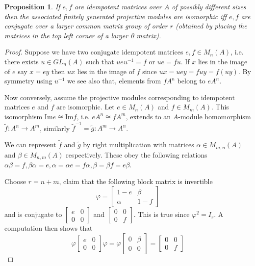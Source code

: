 \documentclass[12pt]{report}
\numberwithin{equation}{section}
\newcommand{\image}{{\mathrm{Im}}}
\newcounter{dummy} \numberwithin{dummy}{section}
\newtheorem{proposition}[dummy]{Proposition}
\begin{document}
	\begin{proposition}
		If $e, f $ are idempotent matrices over $A$ of possibly different sizes then the associated finitely generated projective modules are isomorphic iff $e,f $ are conjugate over a larger common matrix group of order $r$ (obtained by placing the matrices in the top left corner of a larger 0 matrix).
	\end{proposition}
	\begin{proof}
		Suppose we have two conjugate idempotent matrices $e,f \in M_n(A)$, i.e. there exists $u \in GL_n(A)$ such that $ueu^{-1}=f$ or $ue=fu.$ If $x $ lies in the image of $e$ say $x=ey$ then $ux$ lies in the image of $f $ since $ux=uey=fuy=f(uy)	$. By symmetry using $u^{-1}$ we see also that, elements from $fA^n$ belong to $eA^n$.
		
		Now conversely, assume the projective modules corresponding to idempotent matrices $e$ and $f$ are isomorphic.  Let $e \in M_n(A)$ and $f \in M_m(A)$.  This isomorphism $\image e \cong \image f$, i.e. $e A^n \cong  fA^m$, extends to an $A$-module homomorphism $\tilde{f} \colon A^n \to A^m$, similarly $\tilde{f}^{-1} = \tilde{g} \colon A^m \to A^n$. 
		
		We can represent $\tilde{f}$ and $\tilde{g}$ by right multiplication with matrices $\alpha \in M_{m,n}(A)$ and $\beta \in M_{n,m}(A)$ respectively. These obey the following relations $\alpha \beta = f, \beta \alpha=e, \alpha=\alpha e=f \alpha, \beta= \beta f= e \beta  $.
		
		Choose $r = n + m$, claim that the following block matrix is invertible 
		\[
		\varphi = \begin{bmatrix}
			1-e & \beta   \\
			\alpha & 1-f
		\end{bmatrix}
		\]
		and is conjugate to $\begin{bmatrix} e & 0 \\ 0 & 0 \end{bmatrix}$ and $\begin{bmatrix} 0 & 0 \\ 0 & f \end{bmatrix}$.  
		This is true since $\varphi^2=I_{r}$. A computation then shows that \[ \varphi \begin{bmatrix}
			e & 0 \\
			0 & 0
		\end{bmatrix} \varphi= \varphi  \begin{bmatrix}
		0 & \beta \\
		0& 0
		\end{bmatrix} = \begin{bmatrix}
		0 & 0\\
		0& f
		\end{bmatrix}\]
		

\end{proof}
\end{document}
